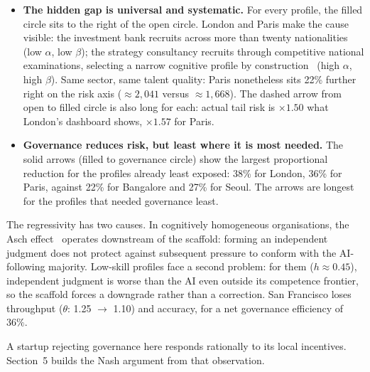 \documentclass[11pt,a4paper]{article}
\begin{document}
\begin{mdframed}[
  backgroundcolor=gray!5,
  linewidth=0.8pt,
  linecolor=black!25,
  frametitle={\small\bfseries Key insights},
  frametitlebackgroundcolor=gray!15,
  frametitleaboveskip=3pt,
  frametitlebelowskip=6pt,
  frametitlerule=true,
  frametitlerulecolor=black!15,
  frametitlerulewidth=0.5pt,
  innertopmargin=8pt,
  innerbottommargin=10pt,
  innerleftmargin=14pt,
  innerrightmargin=14pt
]
\begin{itemize}\setlength\itemsep{6pt}
  \item \textbf{The hidden gap is universal and systematic.}
  For every profile, the filled circle sits to the right of the open circle.
  London and Paris make the cause visible: the investment bank recruits across
  more than twenty nationalities (low $\alpha$, low $\beta$); the strategy
  consultancy recruits through competitive national examinations, selecting a
  narrow cognitive profile by construction~\cite{rivera_asr_2012,
  schneider_pp_1987} (high $\alpha$, high $\beta$).
  Same sector, same talent quality: Paris nonetheless sits 22\% further right
  on the risk axis (${\approx}2{,}041$ versus ${\approx}1{,}668$).
  The dashed arrow from open to filled circle is also long for each: actual
  tail risk is $\times 1.50$ what London's dashboard shows, $\times 1.57$
  for Paris.

  \item \textbf{Governance reduces risk, but least where it is most needed.}
  The solid arrows (filled to governance circle) show the largest proportional
  reduction for the profiles already least exposed: 38\% for London, 36\% for
  Paris, against 22\% for Bangalore and 27\% for Seoul.
  The arrows are longest for the profiles that needed governance least.
\end{itemize}
\end{mdframed}

The regressivity has two causes.
In cognitively homogeneous organisations, the Asch
effect~\cite{asch_guetzkow_1951} operates downstream of the scaffold: forming
an independent judgment does not protect against subsequent pressure to conform
with the AI-following majority.
Low-skill profiles face a second problem: for them ($h \approx 0.45$),
independent judgment is worse than the AI even outside its competence frontier,
so the scaffold forces a downgrade rather than a correction.
San Francisco loses throughput ($\theta$: 1.25 $\to$ 1.10) and accuracy, for a
net governance efficiency of $36\%$.

A startup rejecting governance here responds rationally to its local incentives.
Section~5 builds the Nash argument from that observation.
\end{document}
